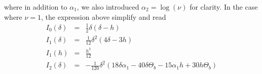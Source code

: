 where    in   addition    to    $\alpha_1$,    we   also    introduced
$\alpha_2=\log(\nu)$  for clarity.   In  the case  where $\nu=1$,  the
expression above simplify and read
\begin{eqnarray}
  I_0(\delta)&=&\frac{1}{2} \delta  (\delta -h)\nonumber\\
  I_1(\delta)&=&\frac{1}{12} \delta ^2 (4 \delta -3 h)\nonumber\\
  I_1(h)&=&\frac{h^3}{12}\nonumber\\
  I_2(\delta)&=&-\frac{1}{120} \delta ^2 (18 \delta  \alpha_1-40 \delta  \Theta_b-15 \alpha_1 h+30 h \Theta_b)\nonumber
\end{eqnarray}

